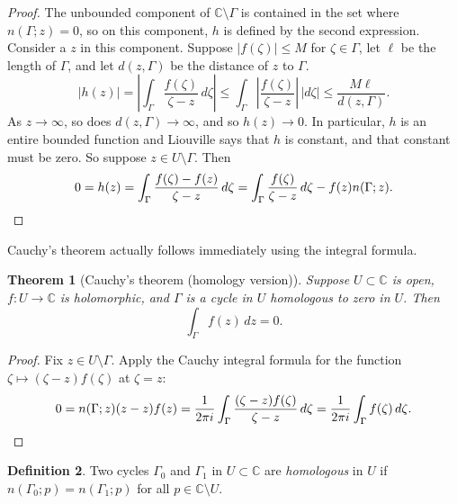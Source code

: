 \documentclass[12pt,openany]{book}
\newcommand{\sabs}[1]{\lvert {#1} \rvert}
\newcommand{\abs}[1]{\left\lvert {#1} \right\rvert}
\newcommand{\C}{{\mathbb{C}}}
\newcommand{\myindex}[1]{#1\index{#1}}
\theoremstyle{plain}
\newtheorem{thm}{Theorem}[section]
\theoremstyle{remark}
\theoremstyle{definition}
\newtheorem{defn}[thm]{Definition}
\theoremstyle{exercise}
\theoremstyle{example}
\begin{document}
\begin{proof}
The unbounded component of $\C \setminus \Gamma$ is contained in the
set where $n(\Gamma;z) = 0$, so on this component, $h$ is defined by the
second expression.  Consider a $z$ in this component.
Suppose $\sabs{f(\zeta)} \leq M$ for $\zeta \in \Gamma$, let $\ell$ be the length of
$\Gamma$, and let $d(z,\Gamma)$ be the distance of $z$ to $\Gamma$.
\begin{equation*}
\sabs{h(z)}
=
\abs{
\int_\Gamma \frac{f(\zeta)}{\zeta-z} \, d\zeta
}
\leq
\int_\Gamma \abs{\frac{f(\zeta)}{\zeta-z}} \, \sabs{d\zeta}
\leq
\frac{M \ell}{d(z,\Gamma)} .
\end{equation*}
As $z \to \infty$, so does $d(z,\Gamma) \to \infty$, and so $h(z) \to 0$.
In particular, $h$ is an entire bounded function and
Liouville says that $h$ is constant, and that constant must be zero.
So suppose $z \in U \setminus \Gamma$.  Then
\begin{equation*}
0 = h(z) =
\int_\Gamma \frac{f(\zeta)-f(z)}{\zeta-z} \, d\zeta
=
\int_\Gamma \frac{f(\zeta)}{\zeta-z} \, d\zeta
-
f(z) n(\Gamma;z) . \qedhere
\end{equation*}
\end{proof}

Cauchy's theorem actually follows immediately using the integral formula.

\begin{thm}[Cauchy's theorem (homology version)]
%
\label{thm:CThomology}%
Suppose $U \subset \C$ is open,
$f \colon U \to \C$ is holomorphic,
and $\Gamma$ is
a cycle
in $U$
homologous to zero in $U$.
Then
\begin{equation*}
\int_\Gamma f(z) \, dz = 0 .
\end{equation*}
\end{thm}

\begin{proof}
Fix $z \in U \setminus \Gamma$.  Apply 
the Cauchy integral formula for the function $\zeta \mapsto
(\zeta-z)f(\zeta)$ at $\zeta=z$:
\begin{equation*}
0 = n(\Gamma;z) (z-z)f(z) =
\frac{1}{2\pi i} \int_\Gamma \frac{(\zeta-z)f(\zeta)}{\zeta-z} \, d\zeta
=
\frac{1}{2\pi i} \int_\Gamma f(\zeta) \, d\zeta . \qedhere
\end{equation*}
\end{proof}

\begin{defn}
Two cycles
$\Gamma_0$ and $\Gamma_1$ in $U
\subset \C$ are \emph{\myindex{homologous}} in $U$
if $n(\Gamma_0;p) = n(\Gamma_1;p)$ for all $p \in \C \setminus U$.
\end{defn}
\end{document}
